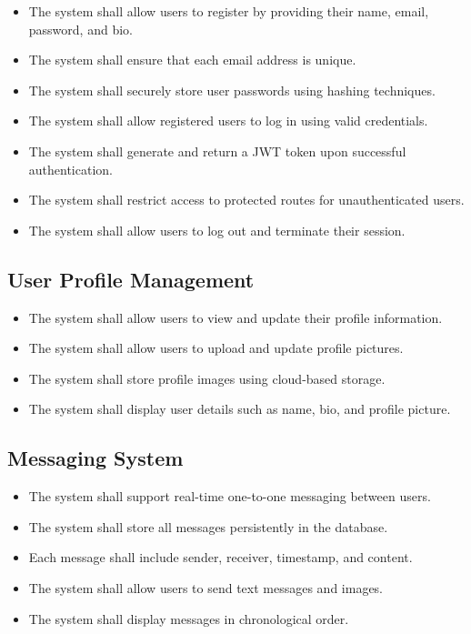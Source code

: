 \documentclass[12pt,a4paper]{report}
\begin{document}
\begin{itemize}
    \item The system shall allow users to register by providing their name, email, password, and bio.
    \item The system shall ensure that each email address is unique.
    \item The system shall securely store user passwords using hashing techniques.
    \item The system shall allow registered users to log in using valid credentials.
    \item The system shall generate and return a JWT token upon successful authentication.
    \item The system shall restrict access to protected routes for unauthenticated users.
    \item The system shall allow users to log out and terminate their session.
\end{itemize}

\subsection{User Profile Management}

\begin{itemize}
    \item The system shall allow users to view and update their profile information.
    \item The system shall allow users to upload and update profile pictures.
    \item The system shall store profile images using cloud-based storage.
    \item The system shall display user details such as name, bio, and profile picture.
\end{itemize}

\subsection{Messaging System}

\begin{itemize}
    \item The system shall support real-time one-to-one messaging between users.
    \item The system shall store all messages persistently in the database.
    \item Each message shall include sender, receiver, timestamp, and content.
    \item The system shall allow users to send text messages and images.
    \item The system shall display messages in chronological order.
\end{itemize}
\end{document}
